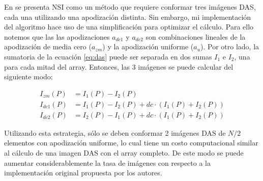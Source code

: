 \documentclass[10pt,a4paper]{article}
\begin{document}
En \cite{Agarwal2019_NSI} se presenta NSI como un método que requiere conformar tres imágenes DAS, cada una utilizando una apodización distinta. Sin embargo, mi implementación del algoritmo hace uso de una simplificación para optimizar el cálculo. Para ello notemos que las las apodizaciones $a_{dc1}$ y $a_{dc2}$ son combinaciones lineales de la apodización de media cero ($a_{zm}$) y la apodización uniforme ($a_u$). Por otro lado, la sumatoria de la ecuación \ref{eq:das} puede ser separada en dos sumas  \(I_1\) e \(I_2\), una para cada mitad del array. Entonces, las 3 imágenes se puede calcular del siguiente modo:


\begin{align}
	I_{zm}(P) &= I_1(P) - I_2(P) \\
	I_{dc1}(P) &= I_1(P) - I_2(P) + dc \cdot (I_1(P) + I_2(P)) \\
	I_{dc2}(P) &= I_2(P) - I_1(P) + dc \cdot (I_1(P) + I_2(P))
\end{align}

Utilizando esta estrategia, sólo se deben conformar 2 imágenes DAS de \(N/2\) elementos con apodización uniforme, lo cual tiene un costo computacional similar al cálculo de una imagen DAS con el array completo. De este modo se puede aumentar considerablemente la tasa de imágenes con respecto a la implementación original propuesta por los autores.

%
%
\end{document}
